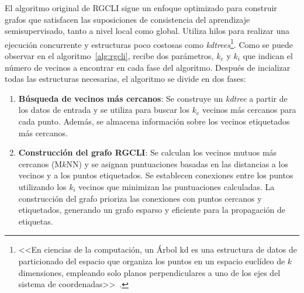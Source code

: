 El algoritmo original de RGCLI sigue un enfoque optimizado para construir grafos que satisfacen las suposiciones de consistencia del aprendizaje semisupervisado, tanto a nivel local como global. Utiliza hilos para realizar una ejecución concurrente y estructuras poco costosas como \textit{kdtrees}\footnote{<<En ciencias de la computación, un Árbol kd es una estructura de datos de particionado del espacio que organiza los puntos en un espacio euclídeo de $k$ dimensiones, empleando solo planos perpendiculares a uno de los ejes del sistema de coordenadas>>~\cite{eswiki:kdtree}.}. Como se puede observar en el algoritmo~\ref{alg:rgcli}, recibe dos parámetros, $k_e$ y $k_i$ que indican el número de vecinos a encontrar en cada fase del algoritmo. Después de incializar todas las estructuras necesarias, el algoritmo se divide en dos fases:
\begin{enumerate}
	\item \textbf{Búsqueda de vecinos más cercanos}: Se construye un \textit{kdtree} a partir de los datos de entrada y se utiliza para buscar los $k_e$ vecinos más cercanos para cada punto. Además, se almacena información sobre los vecinos etiquetados más cercanos.
	\item \textbf{Construcción del grafo RGCLI}: Se calculan los vecinos mutuos más cercanos (M$k$NN) y se asignan puntuaciones basadas en las distancias a los vecinos y a los puntos etiquetados. Se establecen conexiones entre los puntos utilizando los $k_i$ vecinos que minimizan las puntuaciones calculadas. La construcción del grafo prioriza las conexiones con puntos cercanos y etiquetados, generando un grafo esparso y eficiente para la propagación de etiquetas.
\end{enumerate}

